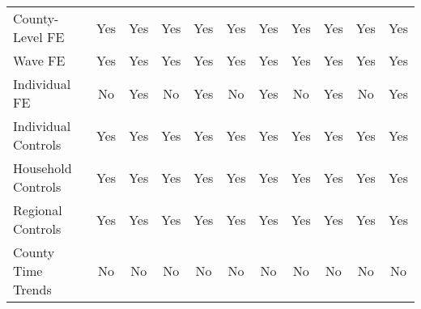 \begin{tabular}{l*{1}cccccccccc}
\midrule

County-Level FE&         Yes         &         Yes         &         Yes         &         Yes         &         Yes      &         Yes         &         Yes         &         Yes         &         Yes         &         Yes         \\
Wave FE     &         Yes         &         Yes         &         Yes         &         Yes         &         Yes         &         Yes         &         Yes         &         Yes         &         Yes         &         Yes         \\
Individual FE&          No         &         Yes         &          No         &         Yes         &          No        &         Yes         &          No         &         Yes         &          No         &         Yes         \\
Individual Controls&         Yes         &         Yes         &         Yes         &         Yes         &         Yes &         Yes         &         Yes         &         Yes         &         Yes         &         Yes         \\
Household Controls&         Yes         &         Yes         &         Yes         &         Yes         &         Yes   &         Yes         &         Yes         &         Yes         &         Yes         &         Yes         \\
Regional Controls&         Yes         &         Yes         &         Yes         &         Yes         &         Yes    &         Yes         &         Yes         &         Yes         &         Yes         &         Yes         \\
County Time Trends&          No         &          No         &          No         &          No         &          No   &          No         &          No         &          No         &          No         &          No         \\





\bottomrule
\end{tabular}